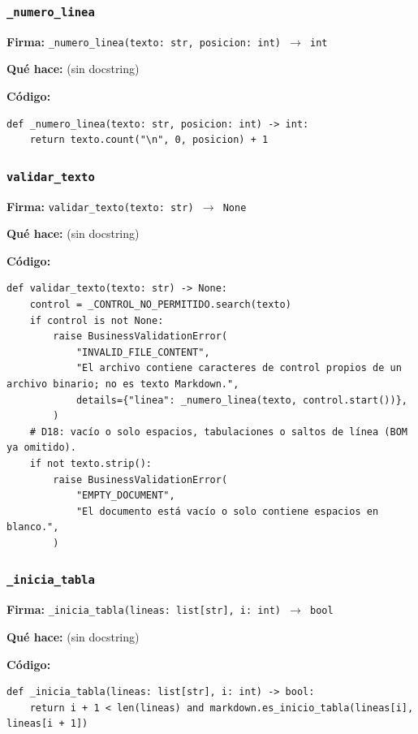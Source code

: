 \documentclass[11pt,a4paper]{article}
\begin{document}
\subsubsection*{\texttt{\_numero\_linea}}
\textbf{Firma:} \texttt{\_numero\_linea(texto: str, posicion: int) $\rightarrow$ int}

\textbf{Qué hace:} (sin docstring)

\textbf{Código:}
\begin{lstlisting}
def _numero_linea(texto: str, posicion: int) -> int:
    return texto.count("\n", 0, posicion) + 1
\end{lstlisting}

\subsubsection*{\texttt{validar\_texto}}
\textbf{Firma:} \texttt{validar\_texto(texto: str) $\rightarrow$ None}

\textbf{Qué hace:} (sin docstring)

\textbf{Código:}
\begin{lstlisting}
def validar_texto(texto: str) -> None:
    control = _CONTROL_NO_PERMITIDO.search(texto)
    if control is not None:
        raise BusinessValidationError(
            "INVALID_FILE_CONTENT",
            "El archivo contiene caracteres de control propios de un archivo binario; no es texto Markdown.",
            details={"linea": _numero_linea(texto, control.start())},
        )
    # D18: vacío o solo espacios, tabulaciones o saltos de línea (BOM ya omitido).
    if not texto.strip():
        raise BusinessValidationError(
            "EMPTY_DOCUMENT",
            "El documento está vacío o solo contiene espacios en blanco.",
        )
\end{lstlisting}

\subsubsection*{\texttt{\_inicia\_tabla}}
\textbf{Firma:} \texttt{\_inicia\_tabla(lineas: list[str], i: int) $\rightarrow$ bool}

\textbf{Qué hace:} (sin docstring)

\textbf{Código:}
\begin{lstlisting}
def _inicia_tabla(lineas: list[str], i: int) -> bool:
    return i + 1 < len(lineas) and markdown.es_inicio_tabla(lineas[i], lineas[i + 1])
\end{lstlisting}
\end{document}
